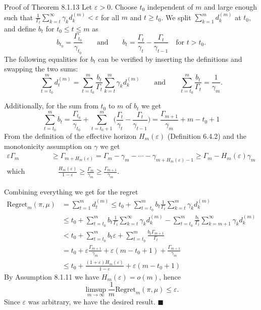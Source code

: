 \documentclass[aspectratio=169,10pt]{beamer}
\begin{document}
\begin{frame}[allowframebreaks]{Proof of Theorem 8.1.13}
  Let $\varepsilon>0$. Choose $t_0$ independent of $m$ and large enough
  such that $\frac1{\Gamma_t}\sum_{k=t}^\infty \gamma_k d_k^{(m)} < \varepsilon$
  for all $m$ and $t\ge t_0$. We split $\sum_{k=1}^m d_k^{(m)}$ at $t_0$, and
  define $b_t$ for $t_0\le t\le m$ as
  $$b_{t_0} = \frac{\Gamma_{t_0}}{\gamma_{t_0}} \qquad\text{and}\qquad
  b_t = \frac{\Gamma_t}{\gamma_t} - \frac{\Gamma_t}{\gamma_{t-1}} \quad \text{for } t>t_0.$$
  The following equalities for $b_t$ can be verified by inserting the
  definitions and swapping the two sums:
  \begin{equation*}
  \sum_{t=t_0}^m d_t^{(m)} = \sum_{t=t_0}^m \frac{b_t}{\Gamma_t}\sum_{k=t}^m \gamma_k d_k^{(m)}
  \qquad\text{and}\qquad \sum_{t=t_0}^m \frac{b_t}{\Gamma_t} = \frac1{\gamma_m}. \tag{8.1.16}
  \end{equation*}

  \framebreak

  Additionally, for the sum from $t_0$ to $m$ of $b_t$ we get
  $$\sum_{t=t_0}^m b_t = \frac{\Gamma_{t_0}}{\gamma_{t_0}} + \sum_{t=t_0+1}^m
  \Big(\frac{\Gamma_t}{\gamma_t}-\frac{\Gamma_t}{\gamma_{t-1}}\Big)
  = \frac{\Gamma_{m+1}}{\gamma_m} + m - t_0 + 1$$
  From the definition of the effective horizon $H_m(\varepsilon)$
  (Definition 6.4.2) and the monotonicity assumption on $\gamma$ we get
  \begin{align*}
  \varepsilon\Gamma_m &\ge \Gamma_{m+H_m(\varepsilon)} = \Gamma_m - \gamma_m -
  \cdots - \gamma_{m+H_m(\varepsilon)-1} \ge \Gamma_m - H_m(\varepsilon)\gamma_m \\
  \text{which implies}&\quad \frac{H_m(\varepsilon)}{1-\varepsilon} \ge
  \frac{\Gamma_m}{\gamma_m} \ge \frac{\Gamma_{m+1}}{\gamma_m}.
  \end{align*}

  Combining everything we get for the regret
  \footnotesize
  \begin{align*}
    \mathrm{Regret}_m(\pi,\mu) &= \sum_{t=1}^m d_t^{(m)}
    \le t_0 + \sum_{t=t_0}^m b_t \frac1{\Gamma_t}\sum_{k=t}^m \gamma_k d_k^{(m)} \\
    &\le t_0 + \sum_{t=t_0}^m b_t \frac1{\Gamma_t}\sum_{k=t}^\infty \gamma_k d_k^{(m)}
       - \sum_{t=t_0}^m \frac{b_t}{\Gamma_t}\sum_{k=m+1}^\infty \gamma_k d_k^{(m)} \\
    &< t_0 + \sum_{t=t_0}^m b_t\varepsilon + \sum_{t=t_0}^m \frac{b_t \Gamma_{m+1}}{\Gamma_t} \\
     &= t_0 + \varepsilon\frac{\Gamma_{m+1}}{\gamma_m} + \varepsilon(m-t_0+1) + \frac{\Gamma_{m+1}}{\gamma_m} \\
    &\le t_0 + \frac{(1+\varepsilon)H_m(\varepsilon)}{1-\varepsilon} + \varepsilon(m-t_0+1)
  \end{align*}
  \normalsize
  By Assumption 8.1.11 we have $H_m(\varepsilon)=o(m)$, hence
  $$\limsup_{m\to\infty}\frac1m\mathrm{Regret}_m(\pi,\mu) \le \varepsilon.$$
  Since $\varepsilon$ was arbitrary, we have the desired result. $\blacksquare$
\end{frame}
\end{document}
